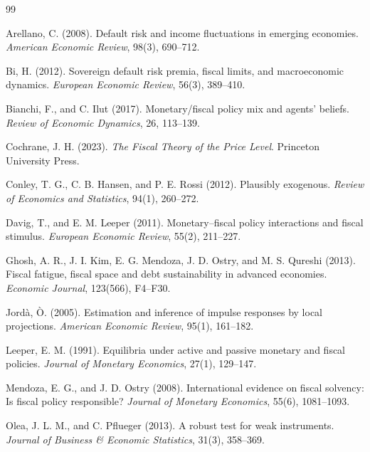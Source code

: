 \documentclass[12pt,a4paper]{article}
\begin{document}
\begin{thebibliography}{99}

Arellano, C. (2008).
Default risk and income fluctuations in emerging economies.
\emph{American Economic Review}, 98(3), 690--712.

Bi, H. (2012).
Sovereign default risk premia, fiscal limits, and macroeconomic dynamics.
\emph{European Economic Review}, 56(3), 389--410.

Bianchi, F., and C. Ilut (2017).
Monetary/fiscal policy mix and agents' beliefs.
\emph{Review of Economic Dynamics}, 26, 113--139.

Cochrane, J. H. (2023).
\emph{The Fiscal Theory of the Price Level}.
Princeton University Press.

Conley, T. G., C. B. Hansen, and P. E. Rossi (2012).
Plausibly exogenous.
\emph{Review of Economics and Statistics}, 94(1), 260--272.

Davig, T., and E. M. Leeper (2011).
Monetary--fiscal policy interactions and fiscal stimulus.
\emph{European Economic Review}, 55(2), 211--227.

Ghosh, A. R., J. I. Kim, E. G. Mendoza, J. D. Ostry, and M. S. Qureshi (2013).
Fiscal fatigue, fiscal space and debt sustainability in advanced economies.
\emph{Economic Journal}, 123(566), F4--F30.

Jordà, Ò. (2005).
Estimation and inference of impulse responses by local projections.
\emph{American Economic Review}, 95(1), 161--182.

Leeper, E. M. (1991).
Equilibria under active and passive monetary and fiscal policies.
\emph{Journal of Monetary Economics}, 27(1), 129--147.

Mendoza, E. G., and J. D. Ostry (2008).
International evidence on fiscal solvency: Is fiscal policy responsible?
\emph{Journal of Monetary Economics}, 55(6), 1081--1093.

Olea, J. L. M., and C. Pflueger (2013).
A robust test for weak instruments.
\emph{Journal of Business \& Economic Statistics}, 31(3), 358--369.


\end{thebibliography}
\end{document}
